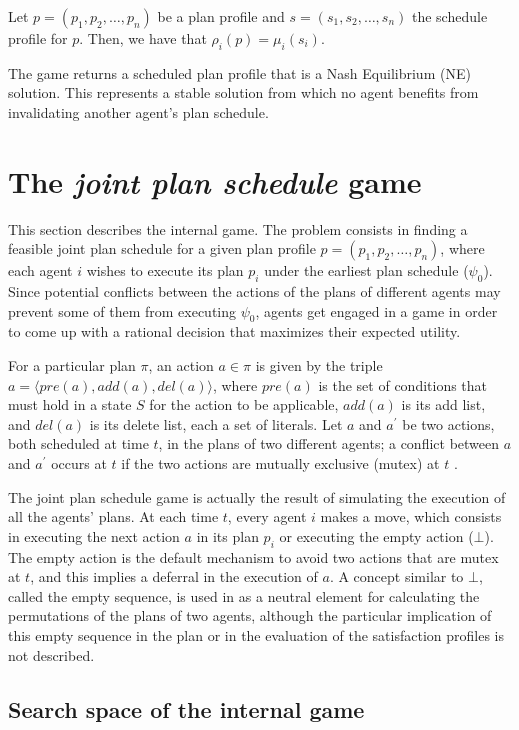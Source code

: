 \documentclass[letterpaper]{article}
\begin{document}
Let $p=(p_1, p_2, \ldots, p_n)$ be a plan profile and $s=(s_1, s_2, \ldots, s_n)$ the schedule profile for $p$. Then, we have that $\rho_i(p)=\mu_i(s_i)$.

The game returns a scheduled plan profile that is a Nash Equilibrium (NE) solution. This represents a stable solution from which no agent benefits from invalidating another agent's plan schedule.


\section{The \emph{joint plan schedule} game}

This section describes the internal game. The problem consists in finding a feasible joint plan schedule for a given plan profile $p=(p_1, p_2, \ldots, p_n)$, where each agent $i$ wishes to execute its plan $p_i$ under the earliest plan schedule ($\psi_0$). Since potential conflicts between the actions of the plans of different agents may prevent some of them from executing $\psi_0$, agents get engaged in a game in order to come up with a rational decision that maximizes their expected utility.

For a particular plan $\pi$, an action $a \in \pi$ is given by the triple $a=\langle pre(a),add(a),del(a) \rangle$, where $pre(a)$ is the set of conditions that must hold in a state $S$ for the action to be applicable, $add(a)$ is its add list, and $del(a)$ is its delete list, each a set of literals. Let $a$ and $a^\prime$ be two actions, both scheduled at time $t$, in the plans of two different agents; a conflict between $a$ and $a^\prime$ occurs at $t$ if the two actions are mutually exclusive (mutex) at $t$ \cite{BlumF97}.

The joint plan schedule game is actually the result of simulating the execution of all the agents' plans. At each time $t$, every agent $i$ makes a move, which consists in executing the next action $a$ in its plan $p_i$ or executing the empty action ($\bot$). The empty action is the default mechanism to avoid two actions that are mutex at $t$, and this implies a deferral in the execution of $a$. A concept similar to $\bot$, called the empty sequence, is used in \cite{LarbiKM07} as a neutral element for calculating the permutations of the plans of two agents, although the particular implication of this empty sequence in the plan or in the evaluation of the satisfaction profiles is not described.

\subsection{Search space of the internal game}
\end{document}
